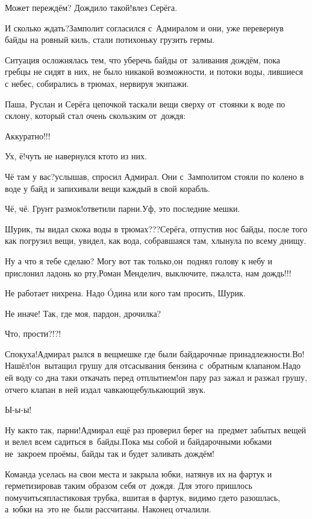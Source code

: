\diagdash Может переждём? Дождило такой!\mdash влез Серёга.

\diagdash И сколько ждать?\mdash Замполит согласился с~Адмиралом и они, уже перевернув байды на ровный киль, стали потихоньку грузить гермы. 

Ситуация осложнялась тем, что уберечь байды от~заливания дождём, пока гребцы не сидят в них, не было никакой возможности, и потоки воды, лившиеся с небес, собирались в трюмах, нервируя экипажи.

Паша, Руслан и Серёга цепочкой таскали вещи сверху от~стоянки к воде по склону, который стал очень скользким от~дождя:

\diagdash Аккуратно!!!

\diagdash Ух, ё!\mdash чуть не навернулся кто\sdash то из них.

\diagdash Чё там у вас?\mdash услышав, спросил Адмирал. Они с~Замполитом стояли по колено в воде у байд и запихивали вещи каждый в свой корабль.

\diagdash Чё, чё. Грунт размок!\mdash ответили парни.\mdash Уф, это последние мешки.

\diagdash Шурик, ты видал скока воды в трюмах???\mdash Серёга, отпустив нос байды, после того как погрузил вещи, увидел, как вода, собравшаяся там, хлынула по всему днищу.

\diagdash Ну а что я тебе сделаю? Могу вот так только,\mdash он~поднял голову к небу и прислонил ладонь ко рту,\mdash Роман Менделич, выключите, п\sdash жалста, нам дождь!!!

\diagdash Не работает нихрена. Надо {\'{O}}дина или кого там просить, Шурик.

\diagdash Не иначе! Так, где моя, пардон, дрочилка?

\diagdash Что, прости?!?!

\diagdash Спокуха!\mdash Адмирал рылся в вещмешке где были байдарочные принадлежности.\mdash Во! Нашёл!\mdash он~вытащил грушу для отсасывания бензина с~обратным клапаном.\mdash Надо ей воду со дна таки откачать перед отплытием!\mdash он пару раз зажал и разжал грушу, отчего клапан в ней издал чавкающе\sdash булькающий звук.

\diagdash Ы-ы-ы! 

\diagdash Ну как\sdash то так, парни!\mdash Адмирал ещё раз проверил берег на~предмет забытых вещей и велел всем садиться в~байды.\mdash Пока мы собой и байдарочными юбками не~закроем проёмы, байды так и будет заливать дождём!

Команда уселась на свои места и закрыла юбки, натянув их на фартук и герметизировав таким образом себя от~дождя. Для этого пришлось помучиться\mdash пластиковая трубка, вшитая в фартук, видимо где\sdash то разошлась, а~юбки на~это не~были рассчитаны. Наконец отчалили.

